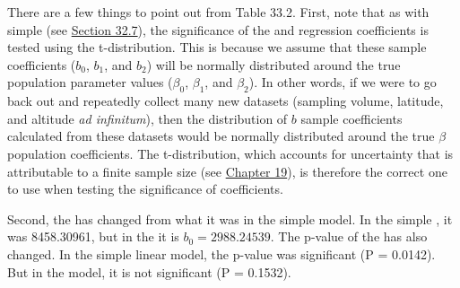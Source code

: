 \documentclass[
  openany]{krantz}
\begin{document}
There are a few things to point out from Table 33.2.
First, note that as with simple  (see \protect\hyperlink{regression-hypothesis-testing}{Section 32.7}), the significance of the  and regression coefficients is tested using the t-distribution.
This is because we assume that these sample coefficients (\(b_{0}\), \(b_{1}\), and \(b_{2}\)) will be normally distributed around the true population parameter values (\(\beta_{0}\), \(\beta_{1}\), and \(\beta_{2}\)).
In other words, if we were to go back out and repeatedly collect many new datasets (sampling volume, latitude, and altitude \emph{ad infinitum}), then the distribution of \(b\) sample coefficients calculated from these datasets would be normally distributed around the true \(\beta\) population coefficients.
The t-distribution, which accounts for uncertainty that is attributable to a finite sample size (see \protect\hyperlink{Chapter_19}{Chapter 19}), is therefore the correct one to use when testing the significance of coefficients.

Second, the  has changed from what it was in the simple  model.
In the simple , it was 8458.30961, but in the  it is \(b_{0} = 2988.24539\).
The p-value of the  has also changed.
In the simple linear model, the p-value was significant (P = 0.0142).
But in the  model, it is not significant (P = 0.1532).

\newpage
\end{document}
